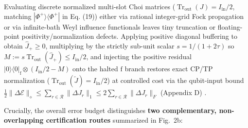 \documentclass[11pt,letterpaper]{article}
\theoremstyle{definition}
\begin{document}
Evaluating discrete normalized multi-slot Choi matrices
(\(\operatorname{Tr}_{\mathrm{out}}(J) = I_{\mathrm{in}}/2\), matching
\(|\Phi^+\rangle\langle\Phi^+|\) in Eq. (19)) either via rational
integer-grid Fock propagation or via infinite-bath Weyl influence
functionals leaves tiny truncation or floating-point
positivity/normalization defects. Applying positive diagonal buffering
to obtain \(\hat{J}_+ \ge 0\), multiplying by the strictly sub-unit
scalar \(s = 1/(1+2\tau)\) so
\(M := s\operatorname{Tr}_{\mathrm{out}}(\hat{J}_+) \le I_{\mathrm{in}}/2\),
and injecting the positive residual
\(|0\rangle\langle 0|_{\mathrm{f}} \otimes (I_{\mathrm{in}}/2 - M)\)
onto the halted \(\mathrm{f}\) branch restores exact CP/TP normalization
(\(\operatorname{Tr}_{\mathrm{out}}(\widetilde{J}) = I_{\mathrm{in}}/2\))
at controlled cost via the qubit-input bound
\(\frac{1}{2}\|\Delta\mathcal{E}\|_\diamond \le \sum_{r\in\mathcal{R}} \|\Delta J_r\|_1 \le 2\sum_{r\in\mathcal{R}} \|\Delta J_r\|_F\)
(Appendix D) \citep{kitaev1997, aharonovKitaevNisan1998, watrous2018}.

Crucially, the overall error budget distinguishes \textbf{two
complementary, non-overlapping certification routes} summarized in
Fig.~2b:
\end{document}
